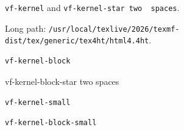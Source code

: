\documentclass{article}
\begin{document}
\verb|vf-kernel| and \verb*|vf-kernel-star two  spaces|.

Long path: \verb|/usr/local/texlive/2026/texmf-dist/tex/generic/tex4ht/html4.4ht|.
\begin{verbatim}
vf-kernel-block
\end{verbatim}
\begin{verbatim*}
vf-kernel-block-star two  spaces
\end{verbatim*}
{\small\verb|vf-kernel-small|}
{\footnotesize
\begin{verbatim}
vf-kernel-block-small
\end{verbatim}
}
\end{document}
